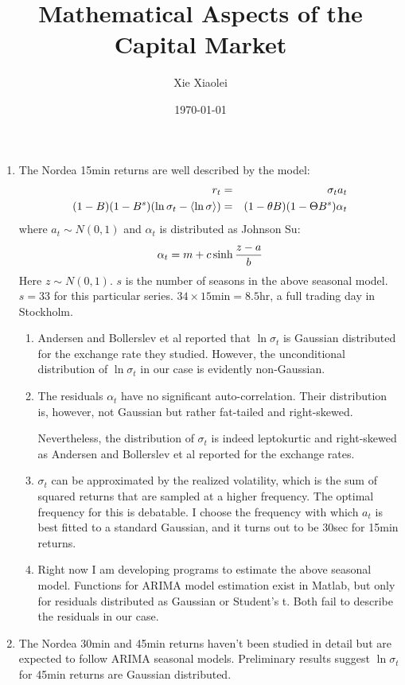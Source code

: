 \documentclass{article}
\title{Mathematical Aspects of the Capital Market}
\author{Xie Xiaolei}
\date{\today}
\begin{document}
\begin{enumerate}
\item The Nordea 15min returns are well described by the model:
\begin{eqnarray*}
  r_t &=& \sigma_t a_t \\
  (1-B)(1-B^s)(\ln\sigma_t - \langle\ln\sigma\rangle) &=& (1-\theta B)(1-\Theta
  B^s) \alpha_t
\end{eqnarray*}
where $a_t \sim N(0, 1)$ and $\alpha_t$ is distributed as Johnson Su:
\[
\alpha_t = m + c\sinh{z - a \over b}
\]
Here $z \sim N(0, 1)$. $s$ is the number of seasons in the above
seasonal model. $s=33$ for this particular series. $34 \times
15\text{min} = 8.5\text{hr}$, a full trading day in Stockholm.

\begin{enumerate}
\item 
Andersen and Bollerslev et al reported that $\ln\sigma_t$ is Gaussian
distributed for the exchange rate they studied. However, the
unconditional distribution of $\ln\sigma_t$ in our case is evidently
non-Gaussian.

\item
The residuals $\alpha_t$ have no significant auto-correlation. Their
distribution is, however, not Gaussian but rather fat-tailed and
right-skewed.

Nevertheless, the distribution of $\sigma_t$ is indeed leptokurtic and
right-skewed as Andersen and Bollerslev et al reported for the
exchange rates.

\item
$\sigma_t$ can be approximated by the realized volatility,
which is the sum of squared returns that are sampled at a higher
frequency. The optimal frequency for this is debatable. I choose the
frequency with which $a_t$ is best fitted to a standard Gaussian, and
it turns out to be 30sec for 15min returns.

\item
Right now I am developing programs to estimate the above
seasonal model. Functions for ARIMA model estimation exist in Matlab,
but only for residuals distributed as Gaussian or Student's t. Both
fail to describe the residuals in our case.

\end{enumerate}
\item The Nordea 30min and 45min returns haven't been studied in
  detail but are expected to follow ARIMA seasonal models. Preliminary
  results suggest $\ln\sigma_t$ for 45min returns are Gaussian
  distributed. 
\end{enumerate}
\end{document}
